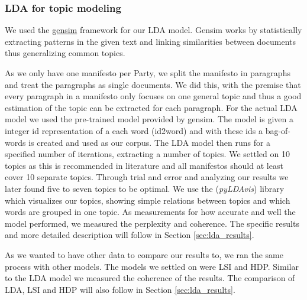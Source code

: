\subsubsection{LDA for topic modeling}
We used the \href{https://radimrehurek.com/gensim/index.html}{gensim} framework \cite{rehurek_lrec} for our LDA model. Gensim works by statistically extracting patterns in the given text and linking similarities between documents thus generalizing common topics. %

As we only have one manifesto per Party, we split the manifesto in paragraphs and treat the paragraphs as single documents. We did this, with the premise that every paragraph in a manifesto only focuses on one general topic and thus a good estimation of the topic can be extracted for each paragraph.
For the actual LDA model we used the pre-trained model provided by gensim. The model is given a integer id representation of a each word (id2word) and with these ids a bag-of-words is created and used as our corpus. The LDA model then runs for a specified number of iterations, extracting a number of topics. We settled on 10 topics as this is recommended in literature \cite{gan2021selection} and all manifestos should at least cover 10 separate topics. Through trial and error and analyzing our results we later found five to seven topics to be optimal. We use the (\textit{pyLDAvis}) library which visualizes our topics, showing simple relations between topics and which words are grouped in one topic. As measurements for how accurate and well the model performed, we measured the perplexity and coherence. The specific results and more detailed description will follow in Section \ref{sec:lda_results}. 

As we wanted to have other data to compare our results to, we ran the same process with other models. The models we settled on were LSI and HDP. Similar to the LDA model we measured the coherence of the results. The comparison of LDA, LSI and HDP will also follow in Section \ref{sec:lda_results}. 



